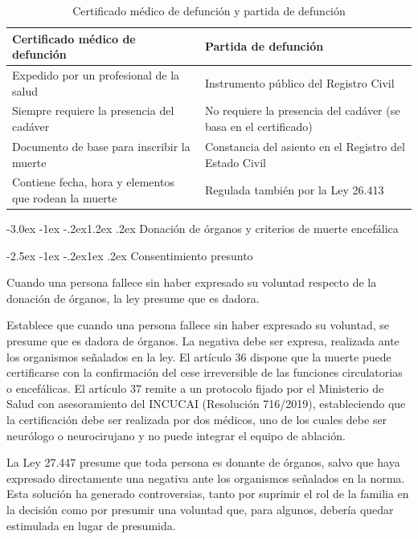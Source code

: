 \documentclass[12pt,oneside]{book}
\makeatletter
\renewcommand\section{\@startsection{section}{1}{\z@}%
  {-3.0ex \@plus -1ex \@minus -.2ex}{1.2ex \@plus .2ex}%
  {\normalfont\large\bfseries\color{acento}}}
\renewcommand\subsection{\@startsection{subsection}{2}{\z@}%
  {-2.5ex \@plus -1ex \@minus -.2ex}{1ex \@plus .2ex}%
  {\normalfont\normalsize\bfseries}}
\makeatother
\begin{document}
\begin{table}[H]
\centering
\caption{Certificado médico de defunción y partida de defunción}
\begin{tabularx}{\textwidth}{X X}
\toprule
\textbf{Certificado médico de defunción} & \textbf{Partida de defunción} \\
\midrule
Expedido por un profesional de la salud & Instrumento público del Registro Civil \\
Siempre requiere la presencia del cadáver & No requiere la presencia del cadáver (se basa en el certificado) \\
Documento de base para inscribir la muerte & Constancia del asiento en el Registro del Estado Civil \\
Contiene fecha, hora y elementos que rodean la muerte & Regulada también por la Ley 26.413 \\
\bottomrule
\end{tabularx}
\end{table}

\section{Donación de órganos y criterios de muerte encefálica}

\subsection{Consentimiento presunto}

Cuando una persona fallece sin haber expresado su voluntad respecto de la donación de órganos, la ley presume que es dadora.

\begin{regla}
Establece que cuando una persona fallece sin haber expresado su voluntad, se presume que es dadora de órganos. La negativa debe ser expresa, realizada ante los organismos señalados en la ley. El artículo 36 dispone que la muerte puede certificarse con la confirmación del cese irreversible de las funciones circulatorias o encefálicas. El artículo 37 remite a un protocolo fijado por el Ministerio de Salud con asesoramiento del INCUCAI (Resolución 716/2019), estableciendo que la certificación debe ser realizada por dos médicos, uno de los cuales debe ser neurólogo o neurocirujano y no puede integrar el equipo de ablación.
\end{regla}

\begin{nota}
La Ley 27.447 presume que toda persona es donante de órganos, salvo que haya expresado directamente una negativa ante los organismos señalados en la norma. Esta solución ha generado controversias, tanto por suprimir el rol de la familia en la decisión como por presumir una voluntad que, para algunos, debería quedar estimulada en lugar de presumida.
\end{nota}
\end{document}

